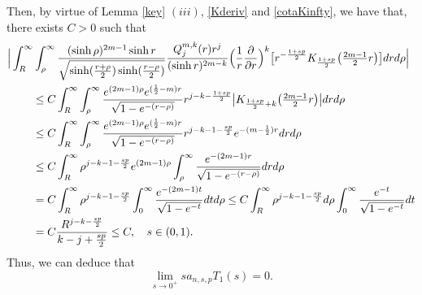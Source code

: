 \documentclass[a4paper,10pt, reqno]{amsart}
\theoremstyle{definition}
\theoremstyle{remark}
\numberwithin{equation}{section}
\begin{document}
{Then, by virtue of Lemma \ref{key} $(iii)$, \eqref{Kderiv} and \eqref{cotaKinfty}, we have that, there exists $C>0$ such that
\begin{align*}
    \Big|\int_R^\infty \int_\rho ^\infty\frac{(\sinh \rho )^{2m-1}\sinh r}{\sqrt{\sinh (\frac{r+\rho}{2})\sinh (\frac{r-\rho }{2})}}\frac{Q_j^{m,k}(r)r^j}{(\sinh r)^{2m-k}}\Big(\frac{1}{r}\frac{\partial }{\partial r}\Big)^k\big[r ^{-\frac{1+sp}{2}}K_{\frac{1+sp}{2}}\big(\tfrac{2m-1}{2}r\big)\big]drd\rho \Big|&\\
    &\hspace{-12cm}\leq C\int_R^\infty \int_\rho ^\infty \frac{e^{(2m-1)\rho }e^{(\frac{1}{2}-m)r}}{\sqrt{1-e^{-(r-\rho )}}}r^{j-k-\frac{1+sp}{2}}\big|K_{\frac{1+sp}{2}+k}
    \big(\tfrac{2m-1}{2}r\big)\big|drd\rho \\
    &\hspace{-12cm}\leq C\int_R^\infty \int_\rho ^\infty \frac{e^{(2m-1)\rho }e^{(\frac{1}{2}-m)r}}{\sqrt{1-e^{-(r-\rho )}}}r^{j-k-1-\frac{sp}{2}}e^{-(m-\frac{1}{2})r}drd\rho\\
    &\hspace{-12cm}\leq C\int_R^\infty \rho ^{j-k-1-\frac{sp}{2}}e^{(2m-1)\rho }\int_\rho ^\infty \frac{e^{-(2m-1)r}}{\sqrt{1-e^{-(r-\rho )}}}drd\rho\\
    &\hspace{-12cm}=C\int_R^\infty \rho ^{j-k-1-\frac{sp}{2}}\int_0 ^\infty \frac{e^{-(2m-1)t}}{\sqrt{1-e^{-t}}}dtd\rho\leq C\int_R^\infty \rho ^{j-k-1-\frac{sp}{2}}d\rho\int_0 ^\infty \frac{e^{-t}}{\sqrt{1-e^{-t}}}dt \\
    &\hspace{-12cm}=C\frac{R^{j-k-\frac{sp}{2}}}{k-j+\frac{sp}{2}} \leq C,\quad s\in (0,1).
\end{align*}
Thus, we can deduce that 
\begin{equation}\label{sT1}
\lim_{s\rightarrow 0^+}sa_{n,s,p}T_1(s)=0.
\end{equation}

}
\end{document}
